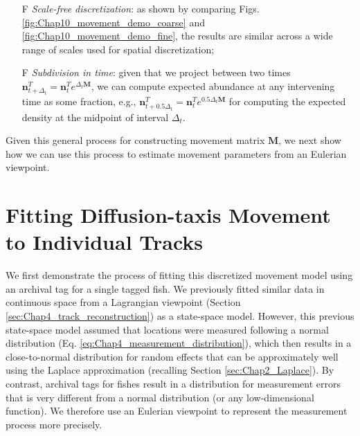 \begin{enumerate}
    \item[F] \textit{Scale-free discretization}:  as shown by comparing Figs. \ref{fig:Chap10_movement_demo_coarse} and \ref{fig:Chap10_movement_demo_fine}, the results are similar across a wide range of scales used for spatial discretization; 

    \item[F] \textit{Subdivision in time}: given that we project between two times \( \mathbf{n}_{t+\Delta_t}^T = \mathbf{n}_t^T e^{\Delta_t \dot{\mathbf{M}}} \), we can compute expected abundance at any intervening time as some fraction, e.g., \( \mathbf{n}_{t+0.5\Delta_t}^T = \mathbf{n}_t^T e^{0.5\Delta_t \dot{\mathbf{M}}} \) for computing the expected density at the midpoint of interval \(\Delta_t\).
\end{enumerate}
Given this general process for constructing movement matrix \(\mathbf{M}\), we next show how we can use this process to estimate movement parameters from an Eulerian viewpoint.

\section{Fitting Diffusion-taxis Movement to Individual Tracks} \label{sec:Chap10_CTMC_cod}

We first demonstrate the process of fitting this discretized movement model using an archival tag for a single tagged fish.  We previously fitted similar data in continuous space from a Lagrangian viewpoint (Section \ref{sec:Chap4_track_reconstruction}) as a state-space model.  However, this previous state-space model assumed that locations were measured following a normal distribution (Eq. \ref{eq:Chap4_measurement_distribution}), which then results in a close-to-normal distribution for random effects that can be approximately well using the Laplace approximation (recalling Section \ref{sec:Chap2_Laplace}).  By contrast, archival tags for fishes result in a distribution for measurement errors that is very different from a normal distribution (or any low-dimensional function).  We therefore use an Eulerian viewpoint to represent the measurement process more precisely.    

